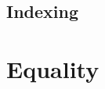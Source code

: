 \subsection{Indexing}


%
%
%
%
%
%
%
%
%
%
%

\section{Equality}
%


%	
%	
%	
%	
%	
%	
%	
%	
%		
%		
%		
 
